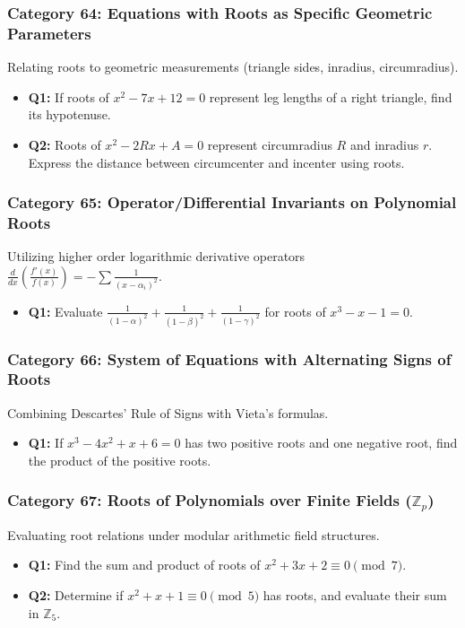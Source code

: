 \documentclass[10pt,a4paper]{article}
\begin{document}
\subsubsection{Category 64: Equations with Roots as Specific Geometric Parameters}
Relating roots to geometric measurements (triangle sides, inradius, circumradius).
\begin{itemize}[leftmargin=*]
    \item \textbf{Q1:} If roots of $x^2 - 7x + 12 = 0$ represent leg lengths of a right triangle, find its hypotenuse.
    \item \textbf{Q2:} Roots of $x^2 - 2Rx + A = 0$ represent circumradius $R$ and inradius $r$. Express the distance between circumcenter and incenter using roots.
\end{itemize}

\subsubsection{Category 65: Operator/Differential Invariants on Polynomial Roots}
Utilizing higher order logarithmic derivative operators $\frac{d}{dx}\left(\frac{f'(x)}{f(x)}\right) = -\sum \frac{1}{(x-\alpha_i)^2}$.
\begin{itemize}[leftmargin=*]
    \item \textbf{Q1:} Evaluate $\frac{1}{(1-\alpha)^2} + \frac{1}{(1-\beta)^2} + \frac{1}{(1-\gamma)^2}$ for roots of $x^3 - x - 1 = 0$.
\end{itemize}

\subsubsection{Category 66: System of Equations with Alternating Signs of Roots}
Combining Descartes' Rule of Signs with Vieta's formulas.
\begin{itemize}[leftmargin=*]
    \item \textbf{Q1:} If $x^3 - 4x^2 + x + 6 = 0$ has two positive roots and one negative root, find the product of the positive roots.
\end{itemize}

\subsubsection{Category 67: Roots of Polynomials over Finite Fields ($\mathbb{Z}_p$)}
Evaluating root relations under modular arithmetic field structures.
\begin{itemize}[leftmargin=*]
    \item \textbf{Q1:} Find the sum and product of roots of $x^2 + 3x + 2 \equiv 0 \pmod 7$.
    \item \textbf{Q2:} Determine if $x^2 + x + 1 \equiv 0 \pmod 5$ has roots, and evaluate their sum in $\mathbb{Z}_5$.
\end{itemize}
\end{document}
